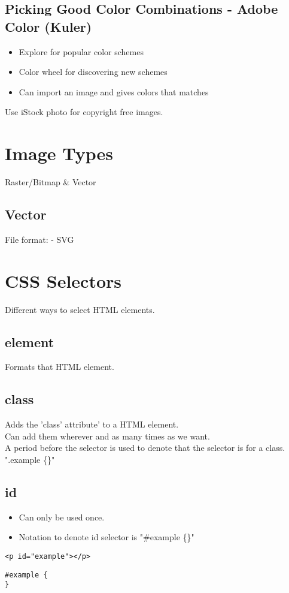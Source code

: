 \documentclass[]{article}
\newcommand{\<}{\guilsinglleft}
\renewcommand{\>}{\guilsinglright}
\begin{document}
\subsection{Picking Good Color Combinations - Adobe Color (Kuler)}
\begin{itemize}
	\item Explore for popular color schemes
	\item Color wheel for discovering new schemes
	\item Can import an image and gives colors that matches
\end{itemize}
Use iStock photo for copyright free images.


\section{Image Types}
Raster/Bitmap \& Vector

\subsection{Vector}
File format: 
 - SVG
\section{CSS Selectors}
Different ways to select HTML elements.
\subsection{element}
Formats that HTML element.
\subsection{class}
Adds the 'class' attribute' to a HTML element.
\\
Can add them wherever and as many times as we want.
\\
A period before the selector is used to denote that the selector is for a class. ".example \{\}"

\subsection{id}
\begin{itemize}
	\item Can only be used once.
	\item Notation to denote id selector is "\#example \{\}" 
\end{itemize}
\begin{lstlisting}
<p id="example"></p>
\end{lstlisting}
\begin{lstlisting}
#example {
}
\end{lstlisting}
\end{document}
